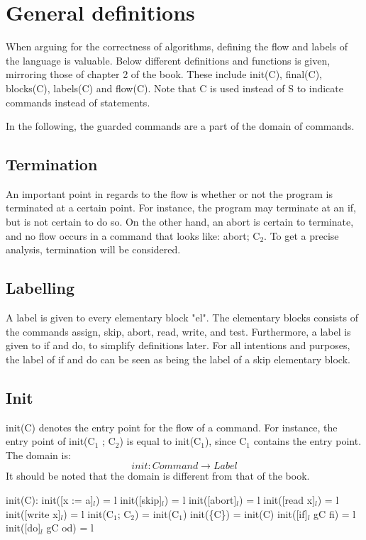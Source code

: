 
\section{General definitions}

\docpar
When arguing for the correctness of algorithms, defining the flow and labels of the language is
valuable. Below different definitions and functions is given, mirroring those of chapter 2 of the
book. These include init(C), final(C), blocks(C), labels(C) and flow(C). Note that C is used instead
of S to indicate commands instead of statements.

In the following, the guarded commands are a part of the domain of commands.

\subsection{Termination}

An important point in regards to the flow is whether or not the program is terminated
at a certain point. For instance, the program may terminate at an if, but is not
certain to do so. On the other hand, an abort is certain to terminate, and no flow
occurs in a command that looks like: abort; C$_2$. To get a precise analysis, termination
will be considered.

\subsection{Labelling}

A label is given to every elementary block "el". The elementary blocks consists of
the commands assign, skip, abort, read, write, and test. Furthermore, a label is given
to if and do, to simplify definitions later. For all intentions and purposes, the
label of if and do can be seen as being the label of a skip elementary block.

\subsection{Init}

init(C) denotes the entry point for the flow of a command.
For instance, the entry point of init(C$_1$ ; C$_2$) is equal to init(C$_1$),
since C$_1$ contains the entry point. The domain is:
\[init \colon Command \to Label\]
It should be noted that the domain is different from that of the book.

init(C):\newline
init([x := a]$_l$)      = l\newline
init([skip]$_l$)        = l\newline
init([abort]$_l$)       = l\newline
init([read x]$_l$)      = l\newline
init([write x]$_l$)     = l\newline
init(C$_1$; C$_2$)        = init(C$_1$)\newline
init(\{C\})             = init(C)\newline
init([if]$_l$ gC fi)        = l\newline
init([do]$_l$ gC od)        = l\newline

